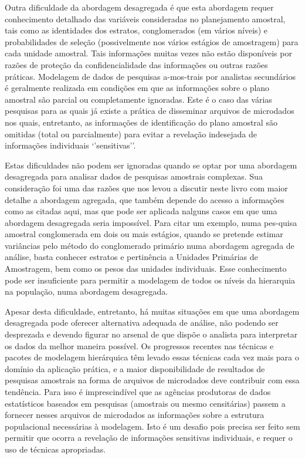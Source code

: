 \documentclass[]{book}
\numberwithin{example}{chapter}
\numberwithin{remark}{chapter}
\numberwithin{definition}{chapter}
\begin{document}
Outra dificuldade da abordagem desagregada é que esta abordagem requer
conhecimento detalhado das variáveis consideradas no planejamento
amostral, tais como as identidades dos estratos, conglomerados (em
vários níveis) e probabilidades de seleção (possivelmente nos vários
estágios de amostragem) para cada unidade amostral. Tais informações
muitas vezes não estão disponíveis por razões de proteção da
confidencialidade das informações ou outras razões práticas. Modelagem
de dados de pesquisas a-mos-trais por analistas secundários é geralmente
realizada em condições em que as informações sobre o plano amostral são
parcial ou completamente ignoradas. Este é o caso das várias pesquisas
para as quais já existe a prática de disseminar arquivos de microdados
nos quais, entretanto, as informações de identificação do plano amostral
são omitidas (total ou parcialmente) para evitar a revelação indesejada
de informações individuais `'sensitivas''.

Estas dificuldades não podem ser ignoradas quando se optar por uma
abordagem desagregada para analisar dados de pesquisas amostrais
complexas. Sua consideração foi uma das razões que nos levou a discutir
neste livro com maior detalhe a abordagem agregada, que também depende
do acesso a informações como as citadas aqui, mas que pode ser aplicada
nalguns casos em que uma abordagem desagregada seria impossível. Para
citar um exemplo, numa pes-quisa amostral conglomerada em dois ou mais
estágios, quando se pretende estimar variâncias pelo método do
conglomerado primário numa abordagem agregada de análise, basta conhecer
estratos e pertinência a Unidades Primárias de Amostragem, bem como os
pesos das unidades individuais. Esse conhecimento pode ser insuficiente
para permitir a modelagem de todos os níveis da hierarquia na população,
numa abordagem desagregada.

Apesar desta dificuldade, entretanto, há muitas situações em que uma
abordagem desagregada pode oferecer alternativa adequada de análise, não
podendo ser desprezada e devendo figurar no arsenal de que dispõe o
analista para interpretar os dados da melhor maneira possível. Os
progressos recentes nas técnicas e pacotes de modelagem hierárquica têm
levado essas técnicas cada vez mais para o domínio da aplicação prática,
e a maior disponibilidade de resultados de pesquisas amostrais na forma
de arquivos de microdados deve contribuir com essa tendência. Para isso
é imprescindível que as agências produtoras de dados estatísticos
baseados em pesquisas (amostrais ou mesmo censitárias) passem a fornecer
nesses arquivos de microdados as informações sobre a estrutura
populacional necessárias à modelagem. Isto é um desafio pois precisa ser
feito sem permitir que ocorra a revelação de informações sensitivas
individuais, e requer o uso de técnicas apropriadas.
\end{document}
